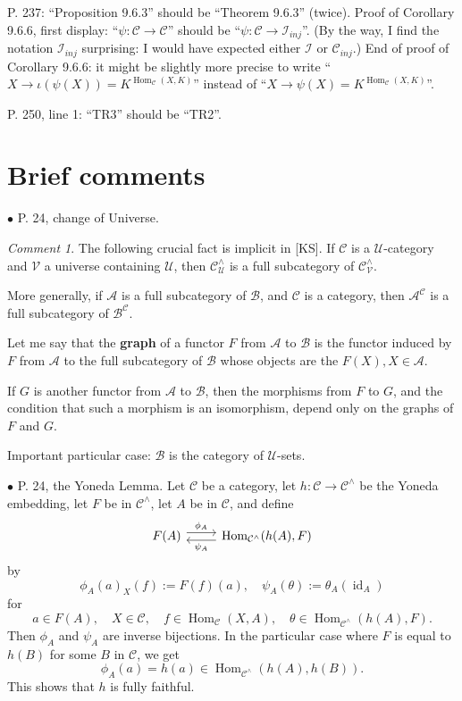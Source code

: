 \documentclass[12pt]{article}
\theoremstyle{remark}
\newtheorem{cm}[thm]{Comment}
\newcommand{\bu}{\bullet}
\newcommand{\n}{\noindent}
\newcommand{\A}{\mathcal A}
\newcommand{\B}{\mathcal B}
\newcommand{\C}{\mathcal C}
\newcommand{\U}{\mathcal U}
\DeclareMathOperator{\id}{id}
\DeclareMathOperator{\Hom}{Hom}
\begin{document}
\n P. 237: ``Proposition 9.6.3'' should be ``Theorem 9.6.3'' (twice). Proof of Corollary 9.6.6, first display: ``$\psi:\C\to\C$'' should be ``$\psi:\C\to\mathcal I_{inj}$''. (By the way, I find the notation $\mathcal I_{inj}$ surprising: I would have expected either $\mathcal I$ or $\C_{inj}$.) End of proof of Corollary 9.6.6: it might be slightly more precise to write ``$X\to\iota(\psi(X))=K^{\Hom_\C(X,K)}$'' instead of ``$X\to\psi(X)=K^{\Hom_\C(X,K)}$''. 

\n P. 250, line 1: ``TR3'' should be ``TR2''.
%
\section{Brief comments}\label{bc}%
%
\n$\bu$ P. 24, change of Universe. 
% 
\begin{cm}\label{graph} 
The following crucial fact is implicit in [KS]. If $\C$ is a $\U$-category and $\mathcal V$ a universe containing $\U$, then $\C^\wedge_\U$ is a full subcategory of $\C^\wedge_\mathcal{V}$. 

More generally, if $\A$ is a full subcategory of $\B$, and $\C$ is a category, then $\A^\C$ is a full subcategory of $\B^\C$.

Let me say that the \textbf{graph} of a functor $F$ from $\A$ to $\B$ is the functor induced by $F$ from $\A$ to the full subcategory of $\B$ whose objects are the $F(X),X\in\A$. 

If $G$ is another functor from $\A$ to $\B$, then the morphisms from $F$ to $G$, and the condition that such a morphism is an isomorphism, depend only on the graphs of $F$ and $G$.

Important particular case: $\B$ is the category of $\U$-sets. 
%
\end{cm} 

%

\n$\bu$ P. 24, the Yoneda Lemma. Let $\C$ be a category, let $h:\C\to\C^\wedge$ be the Yoneda embedding, let $F$ be in $\C^\wedge$, let $A$ be in $\C$, and define 
$$
\begin{tikzcd}
F(A)\ar[yshift=0.7ex]{r}{\phi_A}&\Hom_{\C^\wedge}(h(A),F)\ar[yshift=-0.7ex]{l}{\psi_A}
\end{tikzcd}
$$
by 
$$
\phi_A(a)_X(f):=F(f)(a),\quad\psi_A(\theta):=\theta_A(\id_A)
$$
for 
$$
a\in F(A),\quad X\in\C,\quad f\in\Hom_\C(X,A),\quad\theta\in\Hom_{\C^\wedge}(h(A),F).
$$ 
Then $\phi_A$ and $\psi_A$ are inverse bijections. In the particular case where $F$ is equal to $h(B)$ for some $B$ in $\C$, we get 
$$
\phi_A(a)=h(a)\in\Hom_{\C^\wedge}(h(A),h(B)).
$$
This shows that $h$ is fully faithful. 
\end{document}
